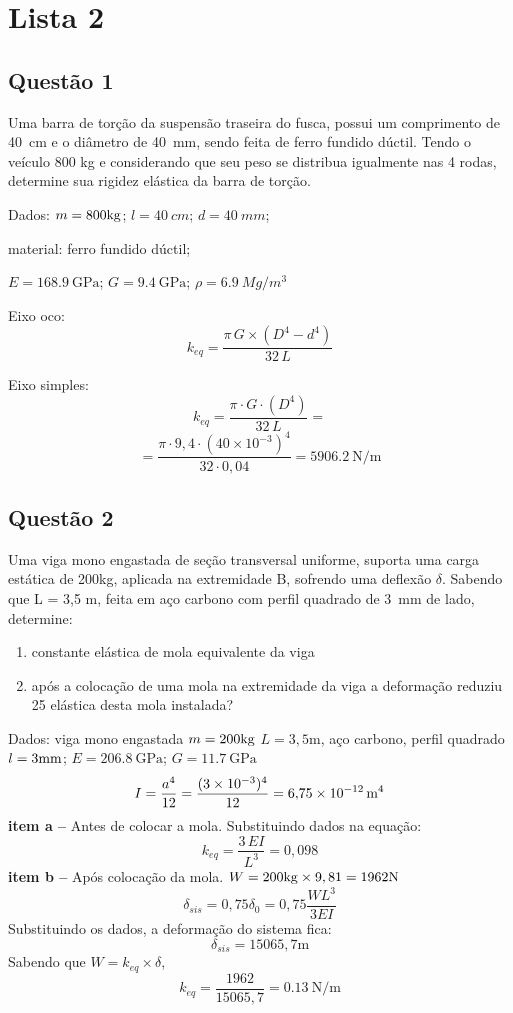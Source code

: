 \section{Lista 2}
\subsection{Questão 1}
Uma barra de torção da suspensão traseira do fusca, possui um comprimento de \SI{40}{cm} e o
diâmetro de \SI{40}{mm}, sendo feita de ferro fundido dúctil. Tendo o veículo 800 kg e considerando que seu peso
se distribua igualmente nas 4 rodas, determine sua rigidez elástica da barra de torção.

\resol
Dados: $m=800\kg$; $l = \SI{40}{cm}$; $d = \SI{40}{mm}$;

material: ferro fundido dúctil;

$ E=\SI{168,9}{\giga\pascal}$; $G =\SI{9,4}{\giga\pascal}$;
$ \rho =\SI{6,9}{Mg\per{m^3}} $

Eixo oco:
\[ k_{eq} = \frac{\pi\, G\times (D^4-d^4)}{32\,L} \]

Eixo simples:
\[
    k_{eq} = \frac{\pi\cdot G\cdot (D^4)}{32\,L}=
\]
\[
=\frac{\pi\cdot 9,4 \cdot (40\times 10^{-3})^{4} }{32\cdot
0,04}=\SI{5906,2}{\newton\per\meter}
\]
\subsection{Questão 2}
Uma viga mono engastada de seção transversal uniforme, suporta uma carga estática de 200kg,
aplicada na extremidade B, sofrendo uma deflexão $\delta$. Sabendo que L = 3,5 m, feita em aço carbono com
perfil quadrado de \SI{3}{mm} de lado, determine:
\begin{enumerate}[label=\alph*)]
    \item constante elástica de mola equivalente da viga
    \item após a colocação de uma mola na extremidade da viga a deformação reduziu 25%
elástica desta mola instalada?
\end{enumerate}

\resol

Dados: viga mono engastada $m=200 \kg$ $L=3,5 \mathrm{m}$, aço carbono, perfil quadrado $l=3 \mm$;
$E=\SI{206,8}{\giga\pascal}$;  $G=\SI{11,7}{\giga\pascal}$
\[
    I=\frac{a^4}{12} = \frac{(3\times 10^{-3})^4}{12}=\SI{6,75d-12}{m^4}
\]
\textbf{item a --} Antes de colocar a mola.
Substituindo dados na equação:
\[
k_{eq}=\frac{3\, E I}{L^3}=0,098
\]
\textbf{item b --} Após colocação da mola.
$W=200\kg \times 9,81 = 1962\mathrm{N}$
\[
    \delta_{sis}=0,75\delta_{0}=0,75 \frac{W L^3}{3E I}
\]
Substituindo os dados, a deformação do sistema fica:
\[
    \delta_{sis}=15065,7\mathrm{m}
\]
Sabendo que $W=k_{eq}\times \delta$,
\[
    k_{eq}=\frac{1962}{15065,7}=\SI{0,13}{\newton\per\meter}
\]

